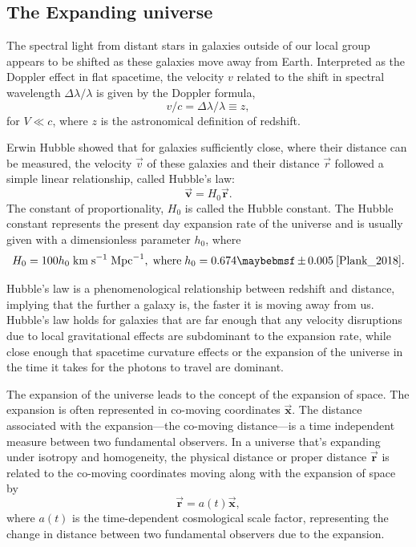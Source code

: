 \subsection{The Expanding universe}

The spectral light from distant stars in galaxies outside of our local group appears to be shifted as these galaxies move away from Earth. Interpreted as the Doppler effect in flat spacetime, the velocity $v$ related to the shift in spectral wavelength $\Delta \lambda/\lambda$ is given by the Doppler formula,
%
\begin{equation}
  v/c = \Delta \lambda/\lambda \equiv z,
\end{equation}
%
for $V \ll c$, where $z$ is the astronomical definition of redshift. 

Erwin Hubble showed that for galaxies sufficiently close, where their distance can be measured, the velocity $\vec{v}$ of these galaxies and their distance $\vec{r}$ followed a simple linear relationship, called Hubble's law:
%
\begin{equation}
  \boldsymbol{\vec{v}} = H_0\boldsymbol{\vec{r}}.
\end{equation}
%
The constant of proportionality, $H_0$ is called the Hubble constant. The Hubble constant represents the present day expansion rate of the universe and is usually given with a dimensionless parameter $h_0$, where
%
\begin{equation}\label{eq:hubble_constant}
  H_0 = 100h_0 \; \MathText{km} \; \MathText{s}^{-1} \; \MathText{Mpc}^{-1}, \; \MathText{where} \; h_0 = 0.674 \pm 0.005 \: \cite{Plank_2018}.
\end{equation}
%

Hubble's law is a phenomenological relationship between redshift and distance, implying that the further a galaxy is, the faster it is moving away from us. Hubble's law holds for galaxies that are far enough that any velocity disruptions due to local gravitational effects are subdominant to the expansion rate, while close enough that spacetime curvature effects or the expansion of the universe in the time it takes for the photons to travel are dominant.

The expansion of the universe leads to the concept of the expansion of space. The expansion is often represented in co-moving coordinates $\boldsymbol{\vec{x}}$. The distance associated with the expansion---the co-moving distance---is a time independent measure between two fundamental observers. In a universe that's expanding under isotropy and homogeneity, the physical distance or proper distance $\boldsymbol{\vec{r}}$ is related to the co-moving coordinates moving along with the expansion of space by
%
\begin{equation}
  \boldsymbol{\vec{r}} = a(t)\boldsymbol{\vec{x}},
\end{equation}
%
where $a(t)$ is the time-dependent cosmological scale factor, representing the change in distance between two fundamental observers due to the expansion.

